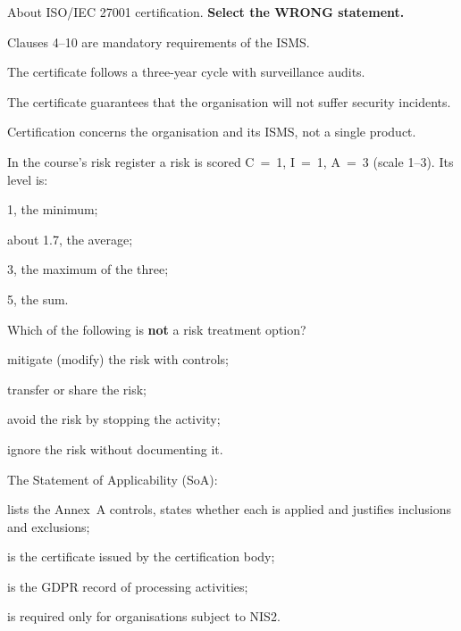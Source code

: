\begin{domanda}\label{q:certificazione}
About ISO/IEC 27001 certification. \textbf{Select the WRONG statement.}
\begin{opzioni}
  \item Clauses 4--10 are mandatory requirements of the ISMS.
  \item The certificate follows a three-year cycle with surveillance audits.
  \item The certificate guarantees that the organisation will not suffer security incidents.
  \item Certification concerns the organisation and its ISMS, not a single product.
\end{opzioni}
\end{domanda}

\begin{domanda}\label{q:max-cia}
In the course's risk register a risk is scored C~=~1, I~=~1, A~=~3 (scale 1--3). Its level is:
\begin{opzioni}
  \item 1, the minimum;
  \item about 1.7, the average;
  \item 3, the maximum of the three;
  \item 5, the sum.
\end{opzioni}
\end{domanda}

\begin{domanda}\label{q:trattamento}
Which of the following is \textbf{not} a risk treatment option?
\begin{opzioni}
  \item mitigate (modify) the risk with controls;
  \item transfer or share the risk;
  \item avoid the risk by stopping the activity;
  \item ignore the risk without documenting it.
\end{opzioni}
\end{domanda}

\begin{domanda}\label{q:soa}
The Statement of Applicability (SoA):
\begin{opzioni}
  \item lists the Annex~A controls, states whether each is applied and justifies inclusions and
    exclusions;
  \item is the certificate issued by the certification body;
  \item is the GDPR record of processing activities;
  \item is required only for organisations subject to NIS2.
\end{opzioni}
\end{domanda}

